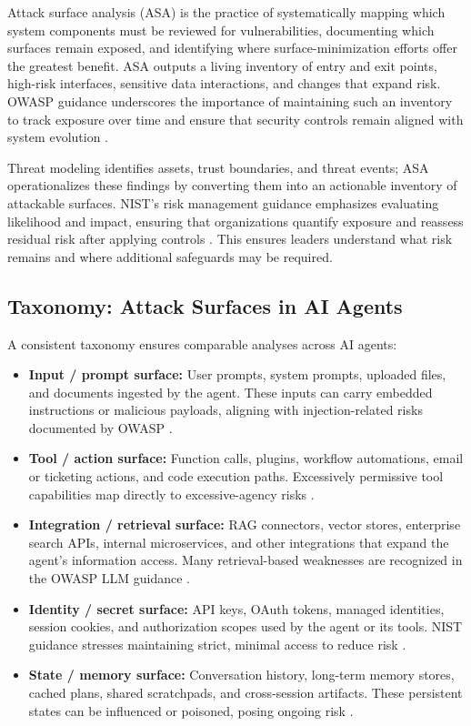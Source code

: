 \begin{TNtwocol}
      Attack surface analysis (ASA) is the practice of systematically mapping which system components must be reviewed for vulnerabilities, documenting which surfaces remain exposed, and identifying where surface-minimization efforts offer the greatest benefit. ASA outputs a living inventory of entry and exit points, high-risk interfaces, sensitive data interactions, and changes that expand risk. OWASP guidance underscores the importance of maintaining such an inventory to track exposure over time and ensure that security controls remain aligned with system evolution \cite{OWASP_LLM_Top10_PDF}.

      Threat modeling identifies assets, trust boundaries, and threat events; ASA operationalizes these findings by converting them into an actionable inventory of attackable surfaces. NIST's risk management guidance emphasizes evaluating likelihood and impact, ensuring that organizations quantify exposure and reassess residual risk after applying controls \cite{NIST_SP800_12R1}. This ensures leaders understand what risk remains and where additional safeguards may be required.

      \subsection{Taxonomy: Attack Surfaces in AI Agents}

      A consistent taxonomy ensures comparable analyses across AI agents:

      \begin{itemize}
            \item \textbf{Input / prompt surface:} User prompts, system prompts, uploaded files, and documents ingested by the agent. These inputs can carry embedded instructions or malicious payloads, aligning with injection-related risks documented by OWASP \cite{OWASP_LLM_Top10}.
            \item \textbf{Tool / action surface:} Function calls, plugins, workflow automations, email or ticketing actions, and code execution paths. Excessively permissive tool capabilities map directly to excessive-agency risks \cite{OWASP_LLM_Top10}.
            \item \textbf{Integration / retrieval surface:} RAG connectors, vector stores, enterprise search APIs, internal microservices, and other integrations that expand the agent's information access. Many retrieval-based weaknesses are recognized in the OWASP LLM guidance \cite{OWASP_LLM_Top10_PDF}.
            \item \textbf{Identity / secret surface:} API keys, OAuth tokens, managed identities, session cookies, and authorization scopes used by the agent or its tools. NIST guidance stresses maintaining strict, minimal access to reduce risk \cite{NIST_SP800_12R1}.
            \item \textbf{State / memory surface:} Conversation history, long-term memory stores, cached plans, shared scratchpads, and cross-session artifacts. These persistent states can be influenced or poisoned, posing ongoing risk \cite{OWASP_LLM_Top10_PDF}.
      \end{itemize}


\end{TNtwocol}
